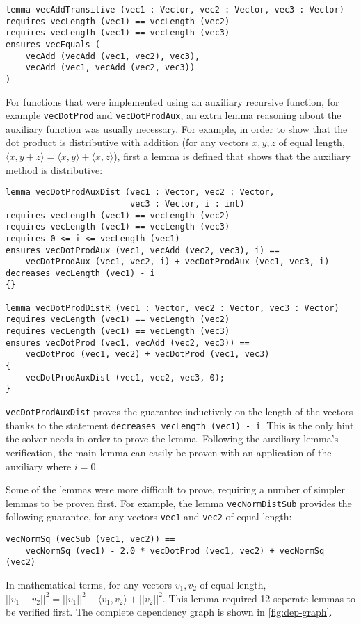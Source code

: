\documentclass[12pt]{article}
\begin{document}
\begin{verbatim}
lemma vecAddTransitive (vec1 : Vector, vec2 : Vector, vec3 : Vector)
requires vecLength (vec1) == vecLength (vec2)
requires vecLength (vec1) == vecLength (vec3)
ensures vecEquals (
    vecAdd (vecAdd (vec1, vec2), vec3),
    vecAdd (vec1, vecAdd (vec2, vec3))
)
\end{verbatim}

For functions that were implemented using an auxiliary recursive function, for example \verb|vecDotProd| and \verb|vecDotProdAux|, an extra lemma reasoning about the auxiliary function was usually necessary. For example, in order to show that the dot product is distributive with addition (for any vectors $x, y, z$ of equal length, $\langle x, y + z \rangle = \langle x, y \rangle + \langle x, z \rangle$), first a lemma is defined that shows that the auxiliary method is distributive:

\begin{verbatim}
lemma vecDotProdAuxDist (vec1 : Vector, vec2 : Vector,
                         vec3 : Vector, i : int)
requires vecLength (vec1) == vecLength (vec2)
requires vecLength (vec1) == vecLength (vec3)
requires 0 <= i <= vecLength (vec1)
ensures vecDotProdAux (vec1, vecAdd (vec2, vec3), i) == 
    vecDotProdAux (vec1, vec2, i) + vecDotProdAux (vec1, vec3, i)
decreases vecLength (vec1) - i
{}

lemma vecDotProdDistR (vec1 : Vector, vec2 : Vector, vec3 : Vector)
requires vecLength (vec1) == vecLength (vec2)
requires vecLength (vec1) == vecLength (vec3)
ensures vecDotProd (vec1, vecAdd (vec2, vec3)) == 
    vecDotProd (vec1, vec2) + vecDotProd (vec1, vec3)
{
    vecDotProdAuxDist (vec1, vec2, vec3, 0);
}
\end{verbatim}

\verb|vecDotProdAuxDist| proves the guarantee inductively on the length of the vectors thanks to the statement \verb|decreases vecLength (vec1) - i|. This is the only hint the solver needs in order to prove the lemma. Following the auxiliary lemma's verification, the main lemma can easily be proven with an application of the auxiliary where $i = 0$.

Some of the lemmas were more difficult to prove, requiring a number of simpler lemmas to be proven first. For example, the lemma \verb|vecNormDistSub| provides the following guarantee, for any vectors \verb|vec1| and \verb|vec2| of equal length:
\begin{verbatim}
vecNormSq (vecSub (vec1, vec2)) == 
    vecNormSq (vec1) - 2.0 * vecDotProd (vec1, vec2) + vecNormSq (vec2)
\end{verbatim}
In mathematical terms, for any vectors $v_1, v_2$ of equal length, $||v_1 - v_2||^2 = ||v_1||^2 - \langle v_1, v_2 \rangle + ||v_2||^2$. This lemma required 12 seperate lemmas to be verified first. The complete dependency graph is shown in \autoref{fig:dep-graph}.
\end{document}
